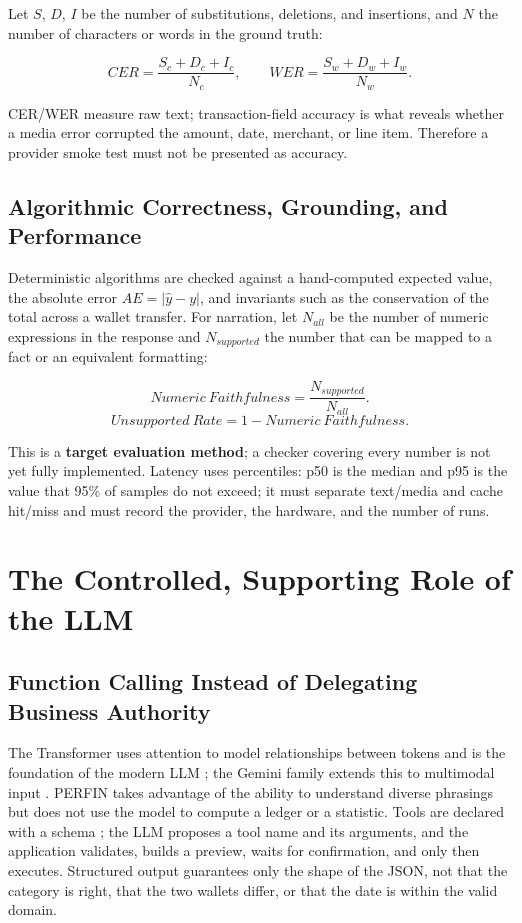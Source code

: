 Let $S$, $D$, $I$ be the number of substitutions, deletions, and
insertions, and $N$ the number of characters or words in the ground
truth:

\begin{equation}
  CER=\frac{S_c+D_c+I_c}{N_c},\qquad
  WER=\frac{S_w+D_w+I_w}{N_w}.
\end{equation}

CER/WER measure raw text; transaction-field accuracy is what reveals
whether a media error corrupted the amount, date, merchant, or line
item. Therefore a provider smoke test must not be presented as accuracy.

\subsection{Algorithmic Correctness, Grounding, and Performance}

Deterministic algorithms are checked against a hand-computed expected
value, the absolute error $AE=|\hat y-y|$, and invariants such as the
conservation of the total across a wallet transfer. For narration, let
$N_{all}$ be the number of numeric expressions in the response and
$N_{supported}$ the number that can be mapped to a fact or an equivalent
formatting:

\begin{equation}
  Numeric\ Faithfulness=\frac{N_{supported}}{N_{all}}.
\end{equation}
\begin{equation}
  Unsupported\ Rate=1-Numeric\ Faithfulness.
\end{equation}

This is a \textbf{target evaluation method}; a checker covering every
number is not yet fully implemented. Latency uses percentiles: p50 is
the median and p95 is the value that 95\% of samples do not exceed; it
must separate text/media and cache hit/miss and must record the
provider, the hardware, and the number of runs.

\section{The Controlled, Supporting Role of the LLM}

\subsection{Function Calling Instead of Delegating Business Authority}

The Transformer uses attention to model relationships between tokens and
is the foundation of the modern LLM \cite{vaswani2017}; the Gemini family
extends this to multimodal input \cite{gemini2023}. PERFIN takes
advantage of the ability to understand diverse phrasings but does not use
the model to compute a ledger or a statistic. Tools are declared with a
schema \cite{geminifunctioncalling}; the LLM proposes a tool name and
its arguments, and the application validates, builds a preview, waits for
confirmation, and only then executes. Structured output guarantees only
the shape of the JSON, not that the category is right, that the two
wallets differ, or that the date is within the valid domain.

